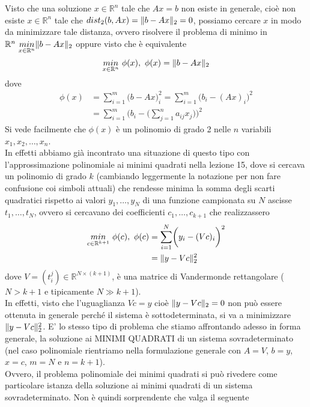 Visto che una soluzione $x \in \mathbb{R}^n$ tale che $Ax=b$ non esiste in generale, cioè non esiste $x \in \mathbb{R}^n$ tale che $dist_2(b,Ax)=\lVert b-Ax\rVert_2 = 0$, possiamo cercare $x$ in modo da minimizzare tale distanza, ovvero risolvere il problema di minimo in $\mathbb{R}^n \ \underset{x\in \mathbb{R}^n}{min} \lVert b-Ax\rVert_2 $ oppure visto che è equivalente
\begin{equation*}
    \underset{x\in \mathbb{R}^n}{min} \ \phi(x), \ \phi(x)=\norma{b-Ax}_2
\end{equation*}
dove
\begin{equation*}
    \begin{split}
        \phi(x) & = \sum_{i=1}^m \biggl(b-Ax\biggr)_i^2 = \sum_{i=1}^m \biggl(b_i - (Ax)_i\biggr)^2 \\
        & = \sum_{i=1}^m \biggl(b_i - \biggl( \sum_{j=1}^n a_{ij}x_j \biggr) \biggr)^2
    \end{split}
\end{equation*}
Si vede facilmente che $\phi(x)$ è un polinomio di grado 2 nelle $n$ variabili $x_1, x_2, \dots, x_n$. \\
In effetti abbiamo già incontrato una situazione di questo tipo con l'approssimazione polinomiale ai minimi quadrati nella lezione 15, dove si cercava un polinomio di grado $k$ (cambiando leggermente la notazione per non fare confusione coi simboli attuali) che rendesse minima la somma degli scarti quadratici rispetto ai valori $y_1,\dots,y_N$ di una funzione campionata su $N$ ascisse $t_1,\dots,t_N$, ovvero si cercavano dei coefficienti $c_1,\dots,c_{k+1}$ che realizzassero
\begin{equation*}
    \begin{split}
        \underset{c\in \mathbb{R}^{k+1}}{min} \ \phi(c), \ \phi(c) & = \sum_ {i=1}^N \biggl( y_i - (Vc)_i \biggr)^2 \\
        & = \lVert y-Vc\rVert_2^2
    \end{split}
\end{equation*}
dove $V=(t_i^j) \in \mathbb{R}^{N\times (k+1)}$, è una matrice di Vandermonde rettangolare ($N>k+1$ e tipicamente $N\gg k+1$). \\
In effetti, visto che l'uguaglianza $Vc=y$ cioè $\lVert y-Vc\rVert_2=0$ non può essere ottenuta in generale perché il sistema è sottodeterminata, si va a minimizzare $\lVert y-Vc\rVert_2^2$. E' lo stesso tipo di problema che stiamo affrontando adesso in forma generale, la soluzione ai MINIMI QUADRATI di un sistema sovradeterminato (nel caso polinomiale rientriamo nella formulazione generale con $A=V$, $b=y$, $x=c$, $m=N$ e $n=k+1$).\\
Ovvero, il problema polinomiale dei minimi quadrati si può rivedere come particolare istanza della soluzione ai minimi quadrati di un sistema sovradeterminato. Non è quindi sorprendente che valga il seguente

